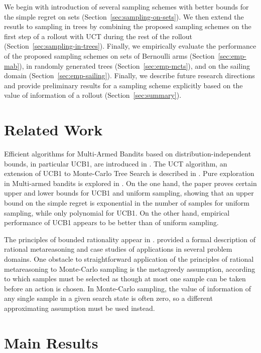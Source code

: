 \documentclass{article}
\begin{document}
We begin with introduction of several sampling schemes with
better bounds for the simple regret on sets (Section~\ref{sec:sampling-on-sets}). We then
extend the resutls to sampling in trees by combining the proposed sampling
schemes on the first step of a rollout with UCT during the rest of the
rollout (Section~\ref{sec:sampling-in-trees}). Finally, we empirically
evaluate the performance of the proposed sampling schemes on sets of
Bernoulli arms (Section~\ref{sec:emp-mab}), in randomly generated
trees (Section~\ref{sec:emp-mcts}), and on the sailing domain
(Section~\ref{sec:emp-sailing}). Finally, we describe future research
directions and provide preliminary results for a sampling scheme
explicitly based on the value of information of a rollout (Section~\ref{sec:summary}).

\section{Related Work}
\label{sec:related-work}

Efficient algorithms for Multi-Armed Bandits based on
distribution-independent bounds, in particular UCB1, are introduced in
\cite{Auer.ucb}. The UCT algorithm, an extension of UCB1 to
Monte-Carlo Tree Search is described in \cite{Kocsis.uct}. Pure
exploration in Multi-armed bandits is explored in
\cite{Bubeck.pure}. On the one hand, the paper proves certain upper
and lower bounds for UCB1 and uniform sampling, showing that an upper
bound on the simple regret is exponential in the number of samples for
uniform sampling, while only polynomial for UCB1. On the other hand,
empirical performance of UCB1 appears to be better than of uniform
sampling. 

The principles of bounded rationality appear in
\cite{Horvitz.reasoningabout}. \cite{Russell.right} provided a formal
description of rational metareasoning and case studies of applications
in several problem domains. One obstacle to straightforward
application of the principles of rational metareasoning to Monte-Carlo
sampling is the metagreedy assumption, according to which samples must
be selected as though at most one sample can be taken before an action
is chosen. In Monte-Carlo sampling, the value of information of any
single sample in a given search state is often zero, so a different
approximating assumption must be used instead.

\section{Main Results}
\label{sec:results}
\end{document}
